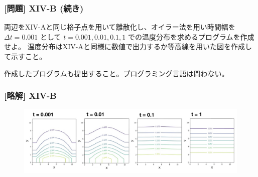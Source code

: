 \documentclass[dvipdfmx,aspectratio=169,20pt]{beamer}
\newcommand{\myfontsetting}[3]{{\fontsize{#1}{#2}\selectfont #3}}
\begin{document}
\begin{frame}
\frametitle{[問題] X\hspace{-.1em}I\hspace{-.1em}V-B (続き)}

\myfontsetting{14pt}{14pt}{
両辺をX\hspace{-.1em}I\hspace{-.1em}V-Aと同じ格子点を用いて離散化し、オイラー法を用い時間幅を $\varDelta t=0.001$ として $t=0.001, 0.01, 0.1,1$ での温度分布を求めるプログラムを作成せよ。
温度分布はX\hspace{-.1em}I\hspace{-.1em}V-Aと同様に数値で出力するか等高線を用いた図を作成して示すこと。
}

\myfontsetting{10pt}{10pt}{
作成したプログラムも提出すること。プログラミング言語は問わない。
}

\end{frame}
\begin{frame}
\frametitle{[略解] X\hspace{-.1em}I\hspace{-.1em}V-B}

\vspace{-2mm}
\begin{figure}[h]
	\begin{center}
    	\includegraphics[width=1.0\textwidth]{fig15-1_report15_ans.jpeg}
	\end{center}
\end{figure}

\end{frame}
\end{document}
